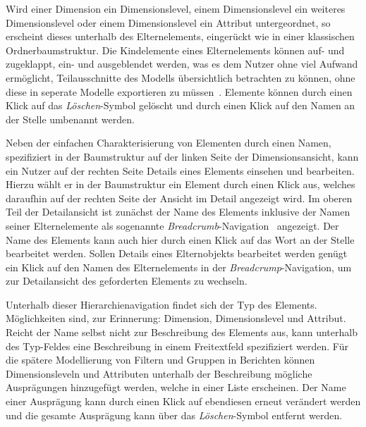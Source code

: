 \documentclass[
  language=german, %
  type=bachelor,%
  ngerman
]{isthesis}
\begin{document}
\begin{content}
  Wird einer Dimension ein Dimensionslevel, einem Dimensionslevel ein weiteres
  Dimensionslevel oder einem Dimensionslevel ein Attribut untergeordnet, so
  erscheint dieses unterhalb des Elternelements, eingerückt wie in einer
  klassischen Ordnerbaumstruktur. Die Kindelemente eines Elternelements können
  auf- und zugeklappt, \bzw{} ein- und ausgeblendet werden, was es dem Nutzer
  ohne viel Aufwand ermöglicht, Teilausschnitte des Modells übersichtlich
  betrachten zu können, ohne diese in seperate Modelle exportieren zu
  müssen~\cite[][S. 6 f.]{fleischer2013konstruktion}.  Elemente können durch einen Klick auf
  das \textit{Löschen}-Symbol gelöscht und durch einen Klick auf den Namen an
  der Stelle umbenannt werden.

  Neben der einfachen Charakterisierung von Elementen durch einen Namen,
  spezifiziert in der Baumstruktur auf der linken Seite der Dimensionsansicht,
  kann ein Nutzer auf der rechten Seite Details eines Elements einsehen und
  bearbeiten.  Hierzu wählt er in der Baumstruktur ein Element durch einen
  Klick aus, welches daraufhin auf der rechten Seite der Ansicht im Detail
  angezeigt wird. Im oberen Teil der Detailansicht ist zunächst der Name des
  Elements inklusive der Namen seiner Elternelemente als sogenannte
  \textit{Breadcrumb}-Navigation~\cite[][S. 1316]{maldonado2002common}
  angezeigt.  Der Name des Elements kann auch hier durch einen Klick auf das
  Wort an der Stelle bearbeitet werden. Sollen Details eines Elternobjekts
  bearbeitet werden genügt ein Klick auf den Namen des Elternelements in der
  \textit{Breadcrump}-Navigation, um zur Detailansicht des geforderten Elements
  zu wechseln. 

  Unterhalb dieser Hierarchienavigation findet sich der Typ des Elements.
  Möglichkeiten sind, zur Erinnerung: Dimension, Dimensionslevel und Attribut.
  Reicht der Name selbst nicht zur Beschreibung des Elements aus, kann
  unterhalb des Typ-Feldes eine Beschreibung in einem Freitextfeld spezifiziert
  werden. Für die spätere Modellierung von Filtern und Gruppen in Berichten
  können Dimensionsleveln und Attributen unterhalb der Beschreibung mögliche
  Ausprägungen hinzugefügt werden, welche in einer Liste erscheinen. Der Name
  einer Ausprägung kann durch einen Klick auf ebendiesen erneut verändert
  werden und die gesamte Ausprägung kann über das
  \textit{Löschen}-Symbol entfernt werden.


\end{content}
\end{document}
